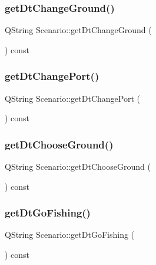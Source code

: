 \subsubsection{\texorpdfstring{getDtChangeGround()}{getDtChangeGround()}}
{\footnotesize\ttfamily Q\+String Scenario\+::get\+Dt\+Change\+Ground (\begin{DoxyParamCaption}{ }\end{DoxyParamCaption}) const}

\mbox{\label{class_scenario_a6986784a0e8ab9bde7614d5207bea794}} 
\subsubsection{\texorpdfstring{getDtChangePort()}{getDtChangePort()}}
{\footnotesize\ttfamily Q\+String Scenario\+::get\+Dt\+Change\+Port (\begin{DoxyParamCaption}{ }\end{DoxyParamCaption}) const}

\mbox{\label{class_scenario_a2e0da0c09af9594ac0b7638a8c2c4945}} 
\subsubsection{\texorpdfstring{getDtChooseGround()}{getDtChooseGround()}}
{\footnotesize\ttfamily Q\+String Scenario\+::get\+Dt\+Choose\+Ground (\begin{DoxyParamCaption}{ }\end{DoxyParamCaption}) const}

\mbox{\label{class_scenario_a583b9e7a2b47ec53c0911442727cad97}} 
\subsubsection{\texorpdfstring{getDtGoFishing()}{getDtGoFishing()}}
{\footnotesize\ttfamily Q\+String Scenario\+::get\+Dt\+Go\+Fishing (\begin{DoxyParamCaption}{ }\end{DoxyParamCaption}) const}

